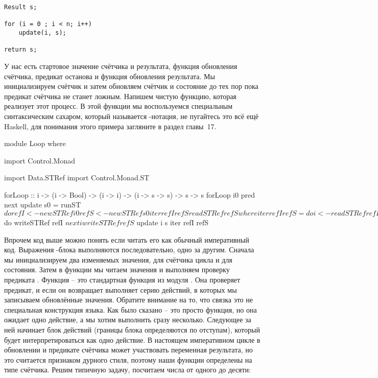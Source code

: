 \begin{verbatim}
Result s;

for (i = 0 ; i < n; i++)
    update(i, s);

return s;
\end{verbatim}

У нас есть стартовое значение счётчика и результата, функция обновления
счётчика, предикат останова и функция обновления результата.
Мы инициализируем счётчик и затем обновляем счётчик и
состояние до тех пор пока предикат счётчика не станет ложным.
Напишем чистую функцию, которая реализует этот процесс. 
В этой функции мы воспользуемся специальным синтаксическим
сахаром, который называется -нотация, не пугайтесь это
всё ещё Haskell, для понимания этого примера 
загляните в раздел  главы~17. 

\begin{code}
module Loop where

import Control.Monad

import Data.STRef
import Control.Monad.ST

forLoop ::  i -> (i -> Bool) -> (i -> i) -> (i -> s -> s) -> s -> s
forLoop i0 pred next update s0 = runST $ do
    refI <- newSTRef i0
    refS <- newSTRef s0
    iter refI refS
    readSTRef refS
    where iter refI refS = do
            i <- readSTRef refI
            s <- readSTRef refS
            when (pred i) $ do
                writeSTRef refI $ next i
                writeSTRef refS $ update i s
                iter refI refS
\end{code}

Впрочем код выше можно понять если читать его как 
обычный императивный код. Выражения -блока выполняются 
последовательно, одно за другим. Сначала мы инициализируем 
два изменяемых значения, для счётчика цикла и для состояния. 
Затем в функции  мы читаем значения и выполняем
проверку предиката . Функция  -- это
стандартная функция из модуля .
Она проверяет предикат, и если он возвращает  
выполняет серию действий, в которых мы записываем
обновлённые значения. Обратите внимание на то, что
связка  это не специальная конструкция языка.
Как было сказано  -- это просто функция, но
она ожидает одно действие, а мы хотим выполнить сразу несколько.
Следующее за ней  начинает блок действий (границы блока 
определяются по отступам), который будет интерпретироваться как
одно действие.
В настоящем императивном цикле в обновлении и предикате счётчика 
может участвовать переменная результата, но это считается 
признаком дурного стиля, поэтому наши функции определены
на типе счётчика. Решим типичную задачу, посчитаем
числа от одного до десяти:

